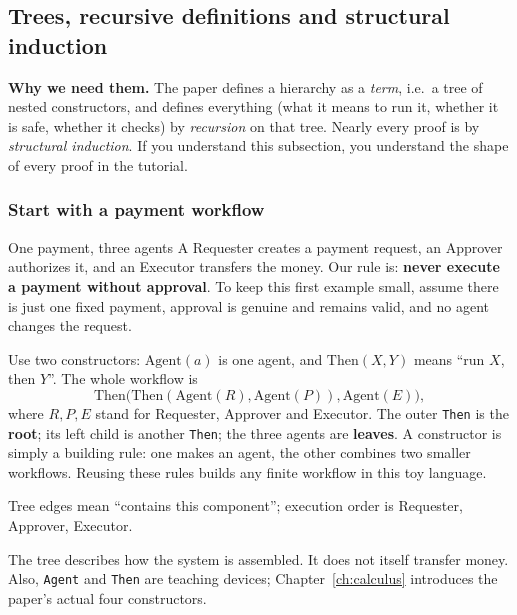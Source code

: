 \subsection{Trees, recursive definitions and structural induction}
\label{sec:trees-induction}

\textbf{Why we need them.} The paper defines a hierarchy as a \emph{term}, i.e.\ a tree of nested constructors, and defines everything (what it means to run it, whether it is safe, whether it checks) by \emph{recursion} on that tree. Nearly every proof is by \emph{structural induction}. If you understand this subsection, you understand the shape of every proof in the tutorial.

\subsubsection{Start with a payment workflow}

\begin{story}{One payment, three agents}
A Requester creates a payment request, an Approver authorizes it, and an Executor transfers the money. Our rule is: \textbf{never execute a payment without approval}. To keep this first example small, assume there is just one fixed payment, approval is genuine and remains valid, and no agent changes the request.

Use two constructors: $\mathrm{Agent}(a)$ is one agent, and $\mathrm{Then}(X,Y)$ means ``run $X$, then $Y$''. The whole workflow is
\[
\mathrm{Then}\bigl(\mathrm{Then}(\mathrm{Agent}(R),\mathrm{Agent}(P)),
                         \mathrm{Agent}(E)\bigr),
\]
where $R,P,E$ stand for Requester, Approver and Executor. The outer \texttt{Then} is the \textbf{root}; its left child is another \texttt{Then}; the three agents are \textbf{leaves}. A constructor is simply a building rule: one makes an agent, the other combines two smaller workflows. Reusing these rules builds any finite workflow in this toy language.

\begin{center}

\small Tree edges mean ``contains this component''; execution order is Requester, Approver, Executor.
\end{center}

The tree describes how the system is assembled. It does not itself transfer money. Also, \texttt{Agent} and \texttt{Then} are teaching devices; Chapter~\ref{ch:calculus} introduces the paper's actual four constructors.
\end{story}

